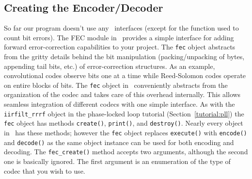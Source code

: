\subsection{Creating the Encoder/Decoder}
\label{tutorial:fec:codec}
So far our program doesn't use any \liquid\ interfaces (except for the
function used to count bit errors).
The FEC module in \liquid\ provides a simple interface for adding
forward error-correction capabilities to your project.
The {\tt fec} object abstracts from the gritty details behind the bit
manipulation (packing/unpacking of bytes, appending tail bits, etc.)
of error-correction structures.
As an example, convolutional codes observe bits one at a time while
Reed-Solomon codes operate on entire blocks of bits.
The {\tt fec} object in \liquid\ conveniently abstracts from the
organization of the codec and takes care of this overhead internally.
This allows seamless integration of different codecs with one simple
interface.
%
As with the {\tt iirfilt\_rrrf} object in the phase-locked loop tutorial
(Section~\ref{tutorial:pll})
the {\tt fec} object has methods
{\tt create()},
{\tt print()}, and
{\tt destroy()}.
Nearly every object in \liquid\ has these methods;
however the {\tt fec} object replaces {\tt execute()} with
{\tt encode()} and {\tt decode()} as the
same object instance can be used for both encoding and decoding.
The {\tt fec\_create()} method accepts two arguments, although the
second one is basically ignored.
The first argument is an enumeration of the type of codec that you wish
to use.

